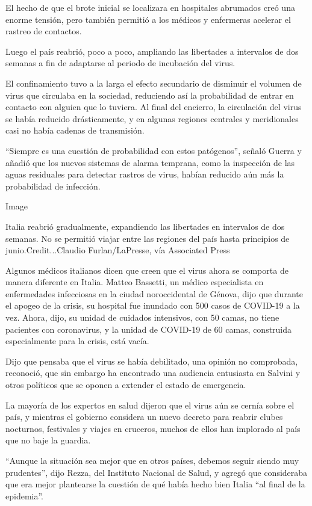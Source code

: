 El hecho de que el brote inicial se localizara en hospitales abrumados
creó una enorme tensión, pero también permitió a los médicos y
enfermeras acelerar el rastreo de contactos.

Luego el país reabrió, poco a poco, ampliando las libertades a
intervalos de dos semanas a fin de adaptarse al periodo de incubación
del virus.

El confinamiento tuvo a la larga el efecto secundario de disminuir el
volumen de virus que circulaba en la sociedad, reduciendo así la
probabilidad de entrar en contacto con alguien que lo tuviera. Al final
del encierro, la circulación del virus se había reducido drásticamente,
y en algunas regiones centrales y meridionales casi no había cadenas de
transmisión.

``Siempre es una cuestión de probabilidad con estos patógenos'', señaló
Guerra y añadió que los nuevos sistemas de alarma temprana, como la
inspección de las aguas residuales para detectar rastros de virus,
habían reducido aún más la probabilidad de infección.

Image

Italia reabrió gradualmente, expandiendo las libertades en intervalos de
dos semanas. No se permitió viajar entre las regiones del país hasta
principios de junio.Credit...Claudio Furlan/LaPresse, vía Associated
Press

Algunos médicos italianos dicen que creen que el virus ahora se comporta
de manera diferente en Italia. Matteo Bassetti, un médico especialista
en enfermedades infecciosas en la ciudad noroccidental de Génova, dijo
que durante el apogeo de la crisis, su hospital fue inundado con 500
casos de COVID-19 a la vez. Ahora, dijo, su unidad de cuidados
intensivos, con 50 camas, no tiene pacientes con coronavirus, y la
unidad de COVID-19 de 60 camas, construida especialmente para la crisis,
está vacía.

Dijo que pensaba que el virus se había debilitado, una opinión no
comprobada, reconoció, que sin embargo ha encontrado una audiencia
entusiasta en Salvini y otros políticos que se oponen a extender el
estado de emergencia.

La mayoría de los expertos en salud dijeron que el virus aún se cernía
sobre el país, y mientras el gobierno considera un nuevo decreto para
reabrir clubes nocturnos, festivales y viajes en cruceros, muchos de
ellos han implorado al país que no baje la guardia.

``Aunque la situación sea mejor que en otros países, debemos seguir
siendo muy prudentes'', dijo Rezza, del Instituto Nacional de Salud, y
agregó que consideraba que era mejor plantearse la cuestión de qué había
hecho bien Italia ``al final de la epidemia''.

